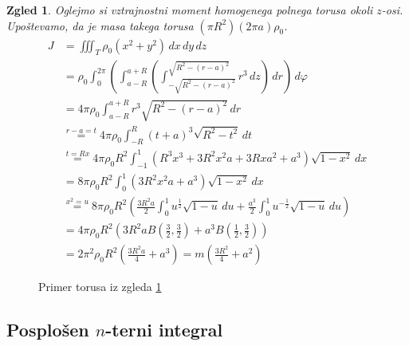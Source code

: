 \documentclass[10pt, a4paper]{article}
\newtheorem{zgled}{Zgled}[section]
\begin{document}
\begin{zgled}\label{zgl:9}
    Oglejmo si vztrajnostni moment homogenega polnega torusa okoli 
    $z$-osi. Upoštevamo, da je masa takega torusa $(\pi R^2) (2 \pi a) \rho_0$.
    \begin{align*}
        J &= \iiint_T \rho_0 (x^2 + y^2)\, dx\, dy\, dz\\
        &= \rho_0 \int_0 ^{2\pi} \left(\int_{a - R} ^{a + R} \left(\int_{-\sqrt{R^2 - (r - a)^2}} ^{\sqrt{R^2 - (r - a)^2}} r^3 \, dz\right)\, dr\right)\, d\varphi\\
        &= 4\pi \rho_0 \int_{a - R} ^{a + R} r^3 \sqrt{R^2 - (r - a)^2}\, dr\\
        &\stackrel{r-a = t}{=} 4 \pi \rho_0 \int_{-R} ^R (t + a)^3 \sqrt{R^2 - t^2}\, dt\\
        &\stackrel{t = Rx}{=} 4 \pi \rho_0 R^2 \int_{-1} ^1 (R^3x^3 + 3R^2 x^2 a + 3Rxa^2 + a^3)\sqrt{1 - x^2}\, dx\\
        &= 8 \pi \rho_0 R^2 \int_{0} ^1 (3R^2 x^2 a + a^3)\sqrt{1 - x^2}\, dx\\
        &\stackrel{x^2 = u}{=} 8 \pi \rho_0 R^2 \left(\frac{3R^2 a}{2} \int_{0} ^1 u^\frac{1}{2} \sqrt{1-u}\, du + \frac{a^3}{2}\int_{0} ^1 u^{-\frac{1}{2}} \sqrt{1-u}\, du\right)\\
        &= 4 \pi \rho_0 R^2 \left(3R^2 a B\left(\frac{3}{2}, \frac{3}{2}\right) + a^3 B\left(\frac{1}{2}, \frac{3}{2}\right)\right)\\
        &= 2 \pi^2 \rho_0 R^2 \left(\frac{3R^2 a}{4} + {a^3}\right)= m\left(\frac{3R^2}{4} + {a^2}\right)
    \end{align*}
\end{zgled}

\begin{figure}[htb!]
    \centering
    \caption{Primer torusa iz zgleda \ref{zgl:9}}
\end{figure}


\subsection{Posplošen $n$-terni integral}
\end{document}
